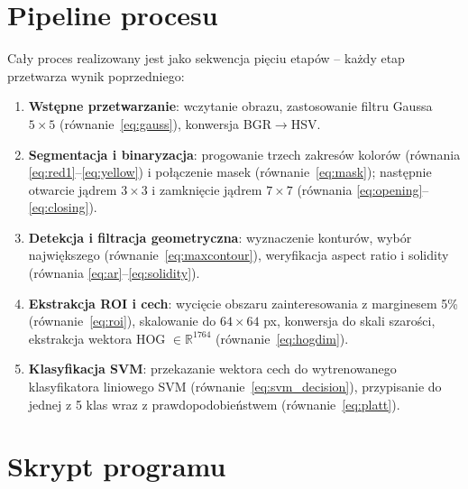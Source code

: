 \documentclass[12pt,oneside]{article}
\begin{document}
\section{Pipeline procesu}
Cały proces realizowany jest jako sekwencja pięciu etapów -- każdy etap przetwarza
wynik poprzedniego:

\begin{enumerate}

    \item \textbf{Wstępne przetwarzanie}: wczytanie obrazu, zastosowanie filtru Gaussa
    $5 \times 5$ (równanie~\ref{eq:gauss}), konwersja BGR$\to$HSV.

    \item \textbf{Segmentacja i binaryzacja}: progowanie trzech zakresów kolorów
    (równania \ref{eq:red1}--\ref{eq:yellow}) i połączenie masek
    (równanie~\ref{eq:mask}); następnie otwarcie jądrem $3\times3$ i zamknięcie
    jądrem $7\times7$ (równania \ref{eq:opening}--\ref{eq:closing}).

    \item \textbf{Detekcja i filtracja geometryczna}: wyznaczenie konturów,
    wybór największego (równanie~\ref{eq:maxcontour}), weryfikacja aspect ratio
    i solidity (równania \ref{eq:ar}--\ref{eq:solidity}).

    \item \textbf{Ekstrakcja ROI i cech}: wycięcie obszaru zainteresowania z marginesem
    5\% (równanie~\ref{eq:roi}), skalowanie do $64 \times 64$ px, konwersja do
    skali szarości, ekstrakcja wektora HOG $\in \mathbb{R}^{1764}$
    (równanie~\ref{eq:hogdim}).

    \item \textbf{Klasyfikacja SVM}: przekazanie wektora cech do wytrenowanego
    klasyfikatora liniowego SVM (równanie~\ref{eq:svm_decision}), przypisanie
    do jednej z 5 klas wraz z prawdopodobieństwem (równanie~\ref{eq:platt}).

\end{enumerate}

\section{Skrypt programu}
\end{document}
